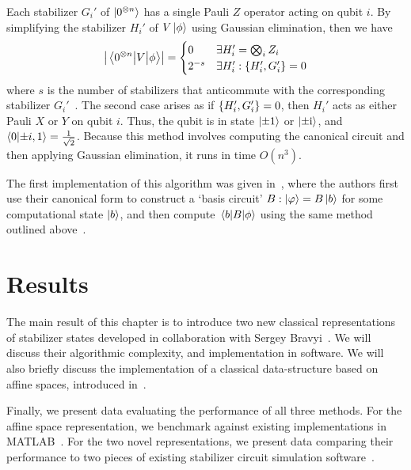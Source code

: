 Each stabilizer $G_{i}'$ of $\ket{0^{\otimes n}}$ has a single Pauli $Z$ operator acting on qubit $i$. By simplifying the stabilizer $H_{i}'$ of $V\ket{\phi}$ using Gaussian elimination, then we have
\begin{equation}
\left\vert \matrixel{0^{\otimes n}}{V}{\phi}\right\vert = \begin{cases}
 0 & \exists H_{i}' = \bigotimes_{i}Z_{i}\\
 2^{-s} & \exists H_{i}' : \acomm{H_{i}'}{G_{i}'} = 0
\end{cases}
\end{equation}
where $s$ is the number of stabilizers that anticommute with the corresponding stabilizer $G_{i}'$~\cite{Aaronson2004}. The second case arises as if $\acomm{H_{i}'}{G_{i}'} = 0$, then $H_{i}'$ acts as either Pauli $X$ or $Y$ on qubit $i$. Thus, the qubit is in state $\ket{\pm 1}$ or $\ket{\pm\mathrm{i}}$, and $\braket{0}{\pm i,1}=\frac{1}{\sqrt{2}}$. Because this method involves computing the canonical circuit and then applying Gaussian elimination, it runs in time $O(n^{3})$.\par
The first implementation of this algorithm was given in~\cite{Garcia2012}, where the authors first use their canonical form to construct a `basis circuit' $B : \ket{\varphi}=B\ket{b}$ for some computational state $\ket{b}$, and then compute $\matrixel{b}{B}{\phi}$ using the same method outlined above~\cite{Garcia2012}.
\section{Results}
The main result of this chapter is to introduce two new classical representations of stabilizer states developed in collaboration with Sergey Bravyi~\cite{Bravyi2018}. We will discuss their algorithmic complexity, and implementation in software. We will also briefly discuss the implementation of a classical data-structure based on affine spaces, introduced in~\cite{Bravyi2016}.\par
Finally, we  present data evaluating the performance of all three methods. For the affine space representation, we benchmark against existing implementations in MATLAB~\cite{Bravyi2016}. For the two novel representations, we present data comparing their performance to two pieces of existing stabilizer circuit simulation software~\cite{Aaronson2004,Anders2006}.

